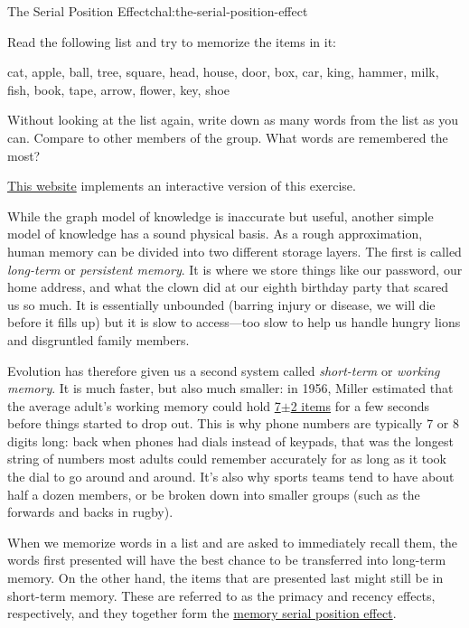 
\begin{challenge}{The Serial Position Effect}{chal:the-serial-position-effect}

Read the following list and try to memorize the items in it:

cat, apple, ball, tree, square, head, house, door, box, car, king,
hammer, milk, fish, book, tape, arrow, flower, key, shoe

Without looking at the list again, write down as many words from the
list as you can. Compare to other members of the group. What words are
remembered the most?

\href{http://cat.xula.edu/thinker/memory/working/serial}{This website}
implements an interactive version of this exercise.
\end{challenge}

While the graph model of knowledge is inaccurate but useful, another
simple model of knowledge has a sound physical basis. As a rough
approximation, human memory can be divided into two different storage
layers. The first is called \emph{long-term} or \emph{persistent
memory}. It is where we store things like our password, our home
address, and what the clown did at our eighth birthday party that scared
us so much. It is essentially unbounded (barring injury or disease, we
will die before it fills up) but it is slow to access---too slow to help
us handle hungry lions and disgruntled family members.

Evolution has therefore given us a second system called
\emph{short-term} or \emph{working memory}. It is much faster, but also
much smaller: in 1956, Miller estimated that the average adult's working
memory could hold
\href{https://en.wikipedia.org/wiki/The\_Magical\_Number\_Seven,\_Plus\_or\_Minus\_Two}{7$\pm$2
items} for a few seconds before things started to drop out. This is why
phone numbers are typically 7 or 8 digits long: back when phones had
dials instead of keypads, that was the longest string of numbers most
adults could remember accurately for as long as it took the dial to go
around and around. It's also why sports teams tend to have about half a
dozen members, or be broken down into smaller groups (such as the
forwards and backs in rugby).

When we memorize words in a list and are asked to immediately recall
them, the words first presented will have the best chance to be
transferred into long-term memory. On the other hand, the items that are
presented last might still be in short-term memory. These are referred
to as the primacy and recency effects, respectively, and they together
form the
\href{https://en.wikipedia.org/wiki/Serial\_position\_effect}{memory
serial position effect}.

